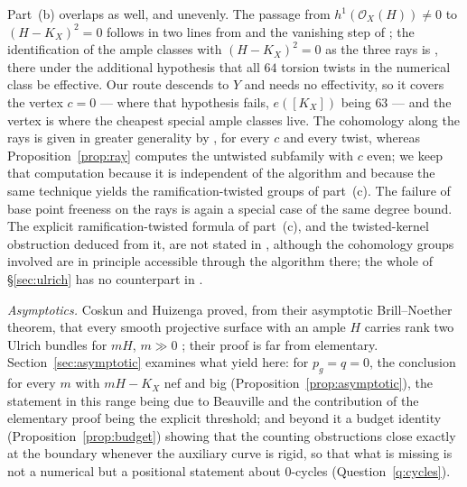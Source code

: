 \documentclass[10pt,a4paper]{amsart}
\newcommand{\OO}{\mathcal{O}}
\begin{document}
Part~(b) overlaps as well, and unevenly. The passage from $h^1(\OO_X(H))\neq0$ to $(H-K_X)^2=0$ follows in two lines from \cite[Prop.~4.2]{Cho26} and the vanishing step of \cite[Algorithm~4.18(3.1)]{Cho26}; the identification of the ample classes with $(H-K_X)^2=0$ as the three rays is \cite[Prop.~4.10]{Cho26}, there under the additional hypothesis that all $64$ torsion twists in the numerical class be effective. Our route descends to $Y$ and needs no effectivity, so it covers the vertex $c=0$ --- where that hypothesis fails, $e([K_X])$ being $63$ --- and the vertex is where the cheapest special ample classes live. The cohomology along the rays is given in greater generality by \cite[Prop.~4.27]{Cho26}, for every $c$ and every twist, whereas Proposition~\ref{prop:ray} computes the untwisted subfamily with $c$ even; we keep that computation because it is independent of the algorithm and because the same technique yields the ramification-twisted groups of part~(c). The failure of base point freeness on the rays is again a special case of the same degree bound. The explicit ramification-twisted formula of part~(c), and the twisted-kernel obstruction deduced from it, are not stated in \cite{Cho26}, although the cohomology groups involved are in principle accessible through the algorithm there; the whole of \S\ref{sec:ulrich} has no counterpart in \cite{Cho26}.

\smallskip
\noindent\emph{Asymptotics.} Coskun and Huizenga proved, from their asymptotic Brill--Noether theorem, that every smooth projective surface with an ample $H$ carries rank two Ulrich bundles for $mH$, $m\gg0$ \cite[Thm.~1.2]{CH20}; their proof is far from elementary. Section~\ref{sec:asymptotic} examines what \cite{LQ94,An94} yield here: for $p_g=q=0$, the conclusion for every $m$ with $mH-K_X$ nef and big (Proposition~\ref{prop:asymptotic}), the statement in this range being due to Beauville \cite{Bea16b} and the contribution of the elementary proof being the explicit threshold; and beyond it a budget identity (Proposition~\ref{prop:budget}) showing that the counting obstructions close exactly at the boundary whenever the auxiliary curve is rigid, so that what is missing is not a numerical but a positional statement about $0$-cycles (Question~\ref{q:cycles}).
\end{document}
